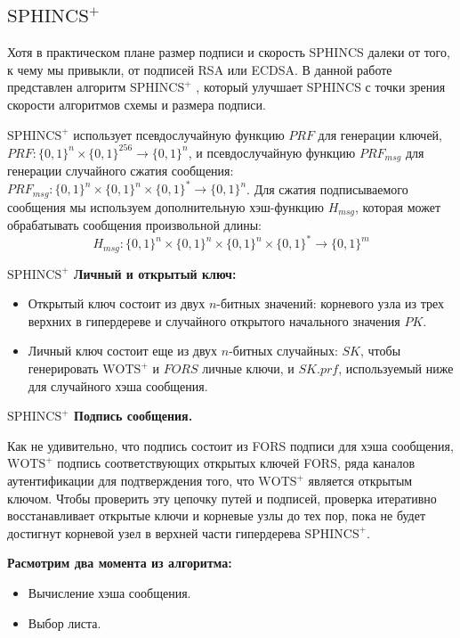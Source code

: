 \documentclass[a4paper, 14pt]{extarticle}
\begin{document}
\subsection{$\text{SPHINCS}^{+}$}
Хотя в практическом плане размер подписи и скорость SPHINCS далеки от того, к чему мы привыкли, от подписей RSA или ECDSA. В данной работе представлен алгоритм $\text{SPHINCS}^{+}$ \cite{stateless}, который улучшает SPHINCS с точки зрения скорости алгоритмов схемы и размера подписи.

$\text{SPHINCS}^{+}$ использует псевдослучайную функцию $PRF$ для генерации ключей, $PRF : \{0, 1\}^{n} \times \{0, 1\}^{256} \rightarrow \{0, 1\}^{n}$, и псевдослучайную функцию $PRF_{msg}$ для генерации случайного сжатия сообщения: $PRF_{msg} : \{0, 1\}^{n} \times \{0, 1\}^{n} \times \{0, 1\}^{*} \rightarrow \{0, 1\}^{n}$. Для сжатия подписываемого сообщения мы используем дополнительную хэш-функцию $H_{msg}$, которая может обрабатывать сообщения произвольной длины:
\[H_{msg} : \{0, 1\}^{n} \times \{0, 1\}^{n} \times \{0, 1\}^{n} \times \{0, 1\}^{*} \rightarrow \{0, 1\}^{m}\]

\textbf{$\text{SPHINCS}^{+}$ Личный и открытый ключ:}

\begin{itemize}
    \item Открытый ключ состоит из двух $n$-битных значений: корневого узла из трех верхних в гипердереве и случайного открытого начального значения $PK$.
    \item Личный ключ состоит еще из двух $n$-битных случайных: $SK$, чтобы генерировать $\text{WOTS}^{+}$ и $FORS$ личные ключи, и $SK.prf$, используемый ниже для случайного хэша сообщения.
\end{itemize}

\textbf{$\text{SPHINCS}^{+}$ Подпись сообщения.}

Как не удивительно, что подпись состоит из FORS подписи для хэша сообщения, $\text{WOTS}^{+}$ подпись соответствующих открытых ключей FORS, ряда каналов аутентификации для подтверждения того, что $\text{WOTS}^{+}$ является открытым ключом. Чтобы проверить эту цепочку путей и подписей, проверка итеративно восстанавливает открытые ключи и корневые узлы до тех пор, пока не будет достигнут корневой узел в верхней части гипердерева $\text{SPHINCS}^{+}$. 
\newline

\textbf{Расмотрим два момента из алгоритма:}

\begin{itemize}
    \item Вычисление хэша сообщения.
    \item Выбор листа.
\end{itemize}
\end{document}
